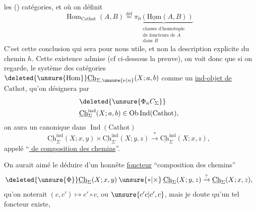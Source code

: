 les () catégories, et  où on définit
\[
\operatorname{Hom}_{\mathrm{Cathot}}(A,B)\overset{\mathrm{déf}}{=}
\underbrace{\pi_0(\underline{\mathrm{Hom}}(A,B))}_{\substack{\text{classes d'homotopie}\\\text{de foncteurs de }A\\\text{dans }B}}
\]
C'est cette conclusion qui sera pour nous utile, et non la description explicite du chemin $h$. Cette existence admise (cf ci-dessous la preuve), on voit donc que si on regarde,  le système des catégories $\deleted{\unsure{\mathrm{Hom}}}\underline{\mathrm{Ch}}_{\Sigma,\unsure{\nu|n}}(X;a,b)$  comme un \uline{ind-objet de $\mathrm{Cathot}$}, qu'on  désignera par
\[
\begin{aligned}
&\deleted{\unsure{\Phi_n C_\Sigma}}\\
&\underline{\mathrm{Ch}}_\Sigma^{\mathrm{ind}}(X;a,b)\in\operatorname{Ob}\operatorname{Ind}(\mathrm{Cathot}),
\end{aligned}
\]
on aura un   canonique dans $\operatorname{Ind}(\mathrm{Cathot})$
\[
\underline{\mathrm{Ch}}_\Sigma^{\mathrm{ind}}(X;x,y)\times\underline{\mathrm{Ch}}_\Sigma^{\mathrm{ind}}(X;y,z)\xrightarrow{*}\underline{\mathrm{Ch}}_\Sigma^{\mathrm{ind}}(X;x,z),
\]
appelé ``\uline{  de composition des chemins}''.

On aurait aimé le déduire d'un honnête \uline{foncteur} ``composition des chemins''
\[
\deleted{\unsure{\Phi}}\underline{\mathrm{Ch}}_\Sigma(X;x,y)\mathbin{\unsure{*|\times}}\underline{\mathrm{Ch}}_\Sigma(X;y,z)\xrightarrow{?}\underline{\mathrm{Ch}}_\Sigma(X;x,z),
\]
qu'on noterait $(c,c')\longmapsto c'\circ c$, ou $\unsure{c'c|c',c}$, mais je doute qu'un tel foncteur existe,

